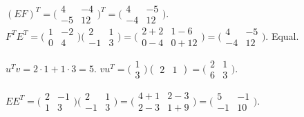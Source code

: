 \begin{solutions}
    \item $(E F)^{T} = \bigl(\begin{smallmatrix} 4 & -4 \\ -5 & 12 \end{smallmatrix}\bigr)^{T} = \bigl(\begin{smallmatrix} 4 & -5 \\ -4 & 12 \end{smallmatrix}\bigr)$. $F^{T} E^{T} = \bigl(\begin{smallmatrix} 1 & -2 \\ 0 & 4 \end{smallmatrix}\bigr)\bigl(\begin{smallmatrix} 2 & 1 \\ -1 & 3 \end{smallmatrix}\bigr) = \bigl(\begin{smallmatrix} 2 + 2 & 1 - 6 \\ 0 - 4 & 0 + 12 \end{smallmatrix}\bigr) = \bigl(\begin{smallmatrix} 4 & -5 \\ -4 & 12 \end{smallmatrix}\bigr)$. Equal.

    \item $u^{T} v = 2 \cdot 1 + 1 \cdot 3 = 5$. $v u^{T} = \bigl(\begin{smallmatrix} 1 \\ 3 \end{smallmatrix}\bigr)\begin{pmatrix} 2 & 1 \end{pmatrix} = \bigl(\begin{smallmatrix} 2 & 1 \\ 6 & 3 \end{smallmatrix}\bigr)$.

    \item $E E^{T} = \bigl(\begin{smallmatrix} 2 & -1 \\ 1 & 3 \end{smallmatrix}\bigr)\bigl(\begin{smallmatrix} 2 & 1 \\ -1 & 3 \end{smallmatrix}\bigr) = \bigl(\begin{smallmatrix} 4 + 1 & 2 - 3 \\ 2 - 3 & 1 + 9 \end{smallmatrix}\bigr) = \bigl(\begin{smallmatrix} 5 & -1 \\ -1 & 10 \end{smallmatrix}\bigr)$.


\end{solutions}
